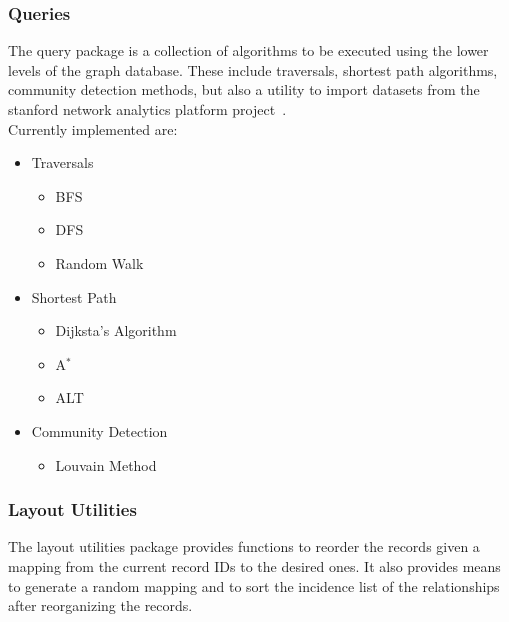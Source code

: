             
    \subsubsection{Queries}
        The query package is a collection of algorithms to be executed using the lower levels of the graph database. These include traversals, shortest path algorithms, community detection methods, but also a utility to import datasets from the stanford network analytics platform project~\autocite{snap}. \\
        Currently implemented are:
        \begin{itemize}
         \item Traversals
         \begin{itemize}
                \item BFS~\autocite{zuse1948allgemeinen}
                \item DFS~\autocite{lucas1891recreations}
                \item Random Walk~\autocite{pearson1905problem}
               \end{itemize}
         \item Shortest Path
         \begin{itemize}
          \item Dijksta's Algorithm~\autocite{dijkstra1959note}
          \item A$^*$~\autocite{hart1968formal}
          \item ALT~\autocite{goldberg2005computing}
         \end{itemize}
        \item Community Detection
        \begin{itemize}
         \item Louvain Method~\autocite{blondel2008fast}
        \end{itemize}

        \end{itemize}

        
    \subsubsection{Layout Utilities}
    The layout utilities package provides functions to reorder the records given a mapping from the current record IDs to the desired ones. It also provides means to generate a random mapping and to sort the incidence list of the relationships after reorganizing the records.
    
